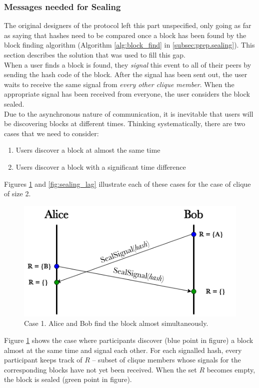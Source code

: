 \documentclass[a4paper, 12pt]{report}
\begin{document}
\subsubsection{Messages needed for Sealing}
The original designers of the protocol left this part unspecified, only going as far as saying that hashes need to be compared once a block has been found by the block finding algorithm (Algorithm \ref{alg:block_find} in \cref{subsec:prep.sealing}). This section describes the solution that was used to fill this gap. \\

When a user finds a block is found, they \emph{signal} this event to all of their peers by sending the hash code of the block. After the signal has been sent out, the user waits to receive the same signal from \emph{every other clique member}. When the appropriate signal has been received from everyone, the user considers the block sealed. \\

Due to the asynchronous nature of communication, it is inevitable that users will be discovering blocks at different times. Thinking systematically, there are two cases that we need to consider:
\begin{enumerate}
    \item Users discover a block at almost the same time
    \item Users discover a block with a significant time difference
\end{enumerate}
Figures \ref{fig:sealing_simult} and \ref{fig:sealing_lag} illustrate each of these cases for the case of clique of size 2.

\begin{figure}[H]
    \captionsetup{width=0.85\textwidth}
    \centering
    \includegraphics[width=0.6\linewidth]{pics/sealing_simult.png}
    \caption{\label{fig:sealing_simult} Case 1. Alice and Bob find the block almost simultaneously.}
\end{figure}
Figure \ref{fig:sealing_simult} shows the case where participants discover ({\color{blue}blue} point in figure) a block almost at the same time and signal each other. For each signalled hash, every participant keeps track of $R$ -- subset of clique members whose signals for the corresponding blocks have not yet been received. When the set $R$ becomes empty, the block is sealed ({\color{deepgreen}green} point in figure).
\end{document}
